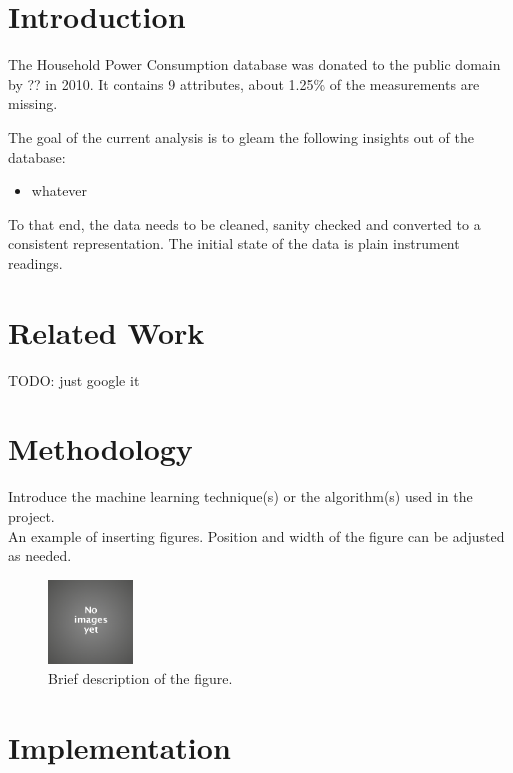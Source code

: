 \documentclass[11pt]{article}
\title{\MakeMeBlue{title?}}
\author{Miroslav Vitkov}
\date{todo: get from rpg repo}
\newcommand{\para}[0]{\par\vspace{0.5cm}}
\begin{document}
\maketitle

\section{Introduction}
The Household Power Consumption database was donated to the public domain by ?? in 2010.
It contains 9 attributes, about 1.25\% of the measurements are missing.
\para
The goal of the current analysis is to gleam the following insights out of the database:
\begin{itemize}
    \item{whatever}
\end{itemize}
\para
To that end, the data needs to be cleaned, sanity checked and converted to a consistent representation.
The initial state of the data is plain instrument readings.

\section{Related Work}
TODO: just google it


\section{Methodology}
Introduce the machine learning technique(s) or the algorithm(s) used in the project. \\

An example of inserting figures. Position and width of the figure can be adjusted as needed.
\begin{figure}[!htp]        
  \centering
    \includegraphics[width=0.2\textwidth]{MyProject-KnowledgeDiscovery/image.jpg}
    \caption{Brief description of the figure.}
\end{figure}

\section{Implementation}
\end{document}

